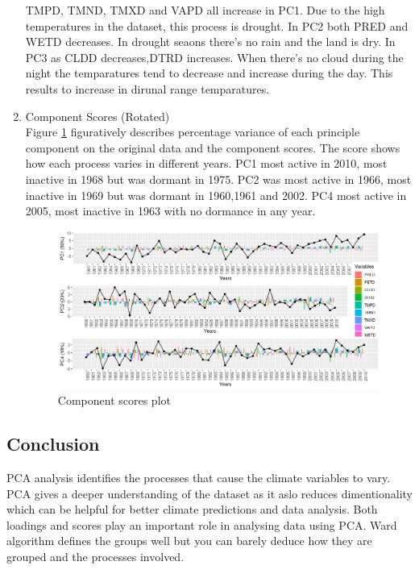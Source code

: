 \documentclass[12pt,a4paper]{article}
\begin{document}
\begin{enumerate}[label=\roman*)]
TMPD, TMND, TMXD and VAPD all increase in PC1. Due to the high temperatures in the dataset, this process is drought.  In PC2 both PRED and WETD decreases. In drought seaons there's no rain and the land is dry. In PC3 as CLDD decreases,DTRD increases. When there's no cloud during the night the temparatures tend to decrease and increase during the day. This results to increase in dirunal range temparatures.
\newpage
\item Component Scores (Rotated)\\
Figure \ref*{fig:scores} figuratively describes percentage variance of each principle component on the original data and the component scores. The score shows how each process varies in different years. PC1 most active in 2010, most inactive in 1968 but was dormant in 1975. PC2 was most active in 1966, most inactive in 1969 but was dormant in 1960,1961 and 2002. PC4 most active in 2005, most inactive in 1963 with no dormance in any year.

\newpage

\begin{figure}[h]
	\includegraphics[width=1.1\linewidth, height=0.5\textheight]{scores}
	\caption{Component scores plot}
	\label{fig:scores}
\end{figure}

\end{enumerate}


\subsection{Conclusion}

PCA analysis identifies the processes that cause the climate variables to vary. PCA gives a deeper understanding of the dataset as it aslo reduces dimentionality which can be helpful for better climate predictions and data analysis. 
Both loadings and scores play an important role in analysing data using PCA. Ward algorithm defines the groups well but you can barely deduce how they are grouped and the processes involved.
\end{document}
